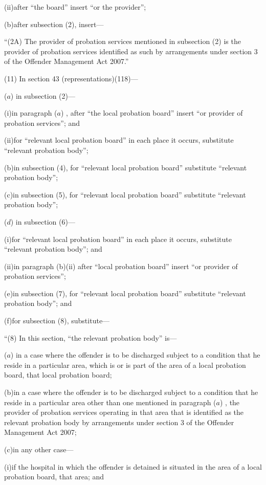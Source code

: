 \documentclass[12pt,a4paper]{article}
\begin{document}
(ii)after “the board” insert “or the provider”;

(b)after subsection (2), insert—

“(2A) The provider of probation services mentioned in subsection (2) is the provider of probation services identified as such by arrangements under section 3 of the Offender Management Act 2007.”

(11) In section 43 (representations)(118)—

($a$) in subsection (2)—

(i)in paragraph ($a$) , after “the local probation board” insert “or provider of probation services”; and

(ii)for “relevant local probation board” in each place it occurs, substitute “relevant probation body”;

(b)in subsection (4), for “relevant local probation board” substitute “relevant probation body”;

(c)in subsection (5), for “relevant local probation board” substitute “relevant probation body”;

($d$) in subsection (6)—

(i)for “relevant local probation board” in each place it occurs, substitute “relevant probation body”; and

(ii)in paragraph (b)(ii) after “local probation board” insert “or provider of probation services”;

(e)in subsection (7), for “relevant local probation board” substitute “relevant probation body”; and

(f)for subsection (8), substitute—

“(8) In this section, “the relevant probation body” is—

($a$) in a case where the offender is to be discharged subject to a condition that he reside in a particular area, which is or is part of the area of a local probation board, that local probation board;

(b)in a case where the offender is to be discharged subject to a condition that he reside in a particular area other than one mentioned in paragraph ($a$) , the provider of probation services operating in that area that is identified as the relevant probation body by arrangements under section 3 of the Offender Management Act 2007;

(c)in any other case—

(i)if the hospital in which the offender is detained is situated in the area of a local probation board, that area; and
\end{document}
